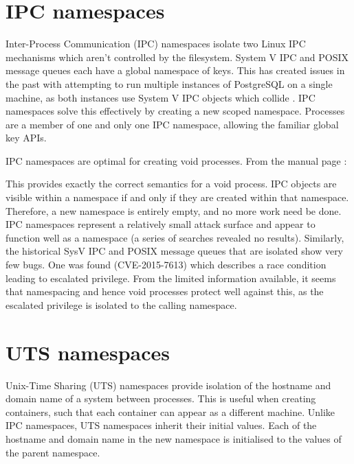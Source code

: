 \documentclass[12pt,a4paper,twoside]{report}
\begin{document}
\section{IPC namespaces}
\label{sec:voiding-ipc}

Inter-Process Communication (IPC) namespaces isolate two Linux IPC mechanisms which aren't controlled by the filesystem. System V IPC and POSIX message queues each have a global namespace of keys. This has created issues in the past with attempting to run multiple instances of PostgreSQL on a single machine, as both instances use System V IPC objects which collide \citep[§4.3]{barham_xen_2003}. IPC namespaces solve this effectively by creating a new scoped namespace. Processes are a member of one and only one IPC namespace, allowing the familiar global key APIs.

IPC namespaces are optimal for creating void processes. From the manual page \citep{free_software_foundation_ipc_namespaces7_2021}:


This provides exactly the correct semantics for a void process. IPC objects are visible within a namespace if and only if they are created within that namespace. Therefore, a new namespace is entirely empty, and no more work need be done. IPC namespaces represent a relatively small attack surface and appear to function well as a namespace (a series of searches revealed no results). Similarly, the historical SysV IPC and POSIX message queues that are isolated show very few bugs. One was found (CVE-2015-7613) which describes a race condition leading to escalated privilege. From the limited information available, it seems that namespacing and hence void processes protect well against this, as the escalated privilege is isolated to the calling namespace.

\section{UTS namespaces}
\label{sec:voiding-uts}

Unix-Time Sharing (UTS) namespaces provide isolation of the hostname and domain name of a system between processes. This is useful when creating containers, such that each container can appear as a different machine. Unlike IPC namespaces, UTS namespaces inherit their initial values. Each of the hostname and domain name in the new namespace is initialised to the values of the parent namespace.
\end{document}
